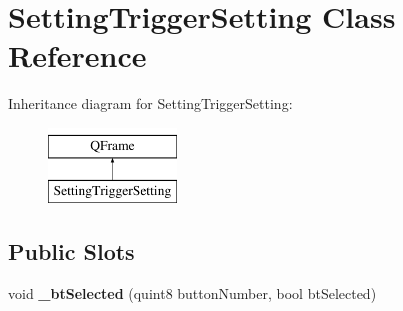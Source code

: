 \hypertarget{class_setting_trigger_setting}{}\section{Setting\+Trigger\+Setting Class Reference}
\label{class_setting_trigger_setting}
Inheritance diagram for Setting\+Trigger\+Setting\+:\begin{figure}[H]
\begin{center}
\leavevmode
\includegraphics[height=2.000000cm]{class_setting_trigger_setting}
\end{center}
\end{figure}
\subsection*{Public Slots}
\begin{DoxyCompactItemize}
\item 
\mbox{\label{class_setting_trigger_setting_a0b6cb430b3619e19aebd891f67450898}} 
void {\bfseries \+\_\+bt\+Selected} (quint8 button\+Number, bool bt\+Selected)
\end{DoxyCompactItemize}
